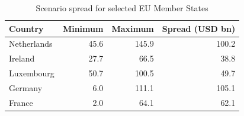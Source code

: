 \begin{table}[H]
\centering
\caption{Scenario spread for selected EU Member States}
\label{tab:stage4_6_country_spread_generated}
\small
\begin{tabular}{@{}lrrr@{}}
\toprule
Country & Minimum & Maximum & Spread (USD bn) \\
\midrule
Netherlands & 45.6 & 145.9 & 100.2 \\
Ireland & 27.7 & 66.5 & 38.8 \\
Luxembourg & 50.7 & 100.5 & 49.7 \\
Germany & 6.0 & 111.1 & 105.1 \\
France & 2.0 & 64.1 & 62.1 \\
\bottomrule
\end{tabular}
\end{table}
